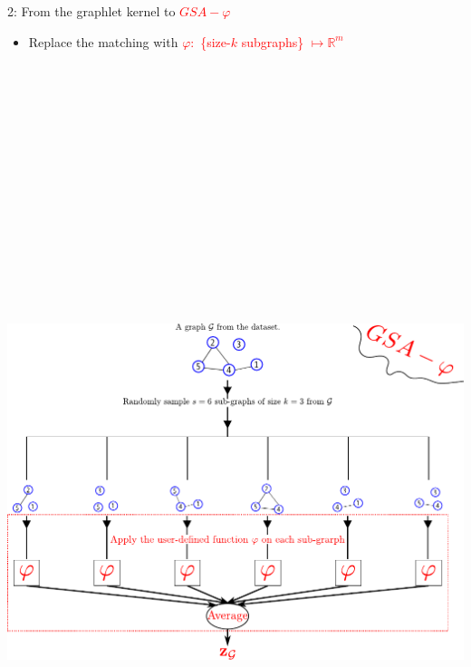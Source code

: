 \documentclass[final,dvipsnames]{beamer}
\newcommand{\myemph}[1]{\textcolor{red}{#1}}
\begin{document}
\begin{frame}{}
\begin{columns}[t]
\begin{column}{0.45\linewidth}
\begin{block}{2: From the graphlet kernel to \myemph{$GSA-\varphi$}}
\begin{minipage}{.99\linewidth}
\begin{mynotablock}
		\end{mynotablock}
	\end{minipage}

\vspace{1cm}
\begin{itemize}
	\item Replace the matching with \myemph{$\varphi:$ \{size-$k$ subgraphs\} $\mapsto\mathbb{R}^m$}
\end{itemize}
\vspace{1cm}
\parbox{0.4\textwidth}{
	\includegraphics[height=25cm]{figs/GSA_phi.pdf} 
}
\end{block}
\end{column}
\end{columns}
\end{frame}
\end{document}
